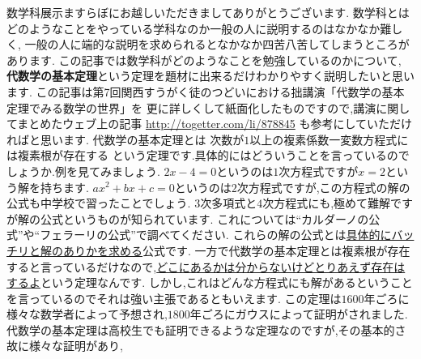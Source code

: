 


数学科展示ますらぼにお越しいただきましてありがとうございます.
数学科とはどのようなことをやっている学科なのか一般の人に説明するのはなかなか難しく,
一般の人に端的な説明を求められるとなかなか四苦八苦してしまうところがあります.
この記事では数学科がどのようなことを勉強しているのかについて,
\textbf{代数学の基本定理}という定理を題材に出来るだけわかりやすく説明したいと思います.
この記事は第7回関西すうがく徒のつどいにおける拙講演「代数学の基本定理でみる数学の世界」を
更に詳しくして紙面化したものですので,講演に関してまとめたウェブ上の記事 \url{http://togetter.com/li/878845} も参考にしていただければと思います.
代数学の基本定理とは
\thm
次数が$1$以上の複素係数一変数方程式には複素根が存在する
\thmx
という定理です.具体的にはどういうことを言っているのでしょうか.例を見てみましょう.
\ex
$2x-4=0$というのは$1$次方程式ですが$x=2$という解を持ちます.
\exx
\ex
$ax^2+bx+c=0$というのは$2$次方程式ですが,この方程式の解の公式も中学校で習ったことでしょう.
\exx
\ex
$3$次多項式と$4$次方程式にも,極めて難解ですが解の公式というものが知られています.
これについては``カルダーノの公式''や``フェラーリの公式''で調べてください.
\exx
これらの解の公式とは\underline{具体的にバッチリと解のありかを求める}公式です.
一方で代数学の基本定理とは複素根が存在すると言っているだけなので,\underline{どこにあるかは分からないけどとりあえず存在はするよ}という定理なんです.
しかし,これはどんな方程式にも解があるということを言っているのでそれは強い主張であるともいえます.
この定理は$1600$年ごろに様々な数学者によって予想され,$1800$年ごろにガウスによって証明がされました.
代数学の基本定理は高校生でも証明できるような定理なのですが,その基本的さ故に様々な証明があり,
